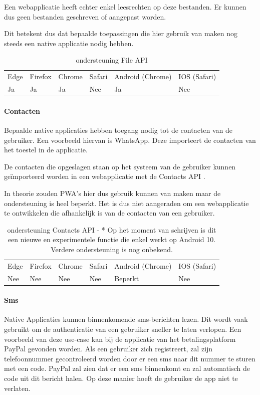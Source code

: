 Een webapplicatie heeft echter enkel leesrechten op deze bestanden. Er kunnen dus geen bestanden geschreven of aangepast worden.

Dit betekent dus dat bepaalde toepassingen die hier gebruik van maken nog steeds een native applicatie nodig hebben.

\begin{table}[H]
	\centering
	\begin{tabular}{llllll}
		Edge & Firefox & Chrome & Safari & Android (Chrome) & IOS (Safari) \\
		Ja   & Ja      &  Ja     & Nee     & Ja               & Nee          
	\end{tabular}	
	\caption{ondersteuning File API}
	\label{ondersteuning File API}
\end{table}	


\paragraph{Contacten}
Bepaalde native applicaties hebben toegang nodig tot de contacten van de gebruiker. Een voorbeeld hiervan is WhatsApp. Deze importeert de contacten van het toestel in de applicatie.

De contacten die opgeslagen staan op het systeem van de gebruiker kunnen geïmporteerd worden in een webapplicatie met de Contacts API \autocite{Tibbett2020}.

In theorie zouden PWA’s hier dus gebruik kunnen van maken maar de ondersteuning is heel beperkt. Het is dus niet aangeraden om een webapplicatie te ontwikkelen die afhankelijk is van de contacten van een gebruiker.

\begin{table}[H]
	\centering
	\begin{tabular}{llllll}
		Edge & Firefox & Chrome & Safari & Android (Chrome) & IOS (Safari) \\
		Nee   & Nee      &  Nee     & Nee     & Beperkt               & Nee          
	\end{tabular}	
	\caption{ondersteuning Contacts API - * Op het moment van schrijven is dit een nieuwe en experimentele functie die enkel werkt op 
	Android 10. Verdere ondersteuning is nog onbekend.
	}
	\label{ondersteuning Contacts API}
\end{table}	


\paragraph{Sms}
Native Applicaties kunnen binnenkomende sms-berichten lezen. Dit wordt vaak gebruikt om de authenticatie van een gebruiker sneller te laten verlopen. Een voorbeeld van deze use-case kan bij de applicatie van het betalingsplatform PayPal gevonden worden. Als een gebruiker zich registreert, zal zijn telefoonnummer gecontroleerd worden door er een sms naar dit nummer te sturen met een code. PayPal zal zien dat er een sms binnenkomt en zal automatisch de code uit dit bericht halen. Op deze manier hoeft de gebruiker de app niet te verlaten.

